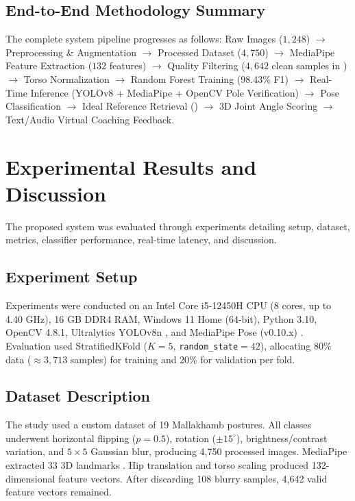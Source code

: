 \documentclass{ieeeaccess}
\begin{document}
\subsection{End-to-End Methodology Summary}
The complete system pipeline progresses as follows: Raw Images ($1,248$) $\rightarrow$ Preprocessing \& Augmentation $\rightarrow$ Processed Dataset ($4,750$) $\rightarrow$ MediaPipe Feature Extraction ($132$ features) $\rightarrow$ Quality Filtering ($4,642$ clean samples in ) $\rightarrow$ Torso Normalization $\rightarrow$ Random Forest Training (98.43\% F1) $\rightarrow$ Real-Time Inference (YOLOv8 + MediaPipe + OpenCV Pole Verification) $\rightarrow$ Pose Classification $\rightarrow$ Ideal Reference Retrieval () $\rightarrow$ 3D Joint Angle Scoring $\rightarrow$ Text/Audio Virtual Coaching Feedback.

\section{Experimental Results and Discussion}
\label{sec:results}
The proposed system was evaluated through experiments detailing setup, dataset, metrics, classifier performance, real-time latency, and discussion.

\subsection{Experiment Setup}
Experiments were conducted on an Intel Core i5-12450H CPU (8 cores, up to 4.40 GHz), 16 GB DDR4 RAM, Windows 11 Home (64-bit), Python 3.10, OpenCV 4.8.1, Ultralytics YOLOv8n \cite{b7}, and MediaPipe Pose (v0.10.x) \cite{b14,b12}. Evaluation used StratifiedKFold ($K=5$, \texttt{random\_state}$=42$), allocating 80\% data ($\approx3,713$ samples) for training and 20\% for validation per fold.

\subsection{Dataset Description}
The study used a custom dataset of 19 Mallakhamb postures. All classes underwent horizontal flipping ($p=0.5$), rotation ($\pm15^\circ$), brightness/contrast variation, and $5\times5$ Gaussian blur, producing 4,750 processed images. MediaPipe extracted 33 3D landmarks \cite{b14,b12}. Hip translation and torso scaling produced 132-dimensional feature vectors. After discarding 108 blurry samples, 4,642 valid feature vectors remained.
\end{document}
